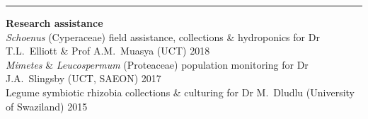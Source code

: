 \documentclass[10pt]{article}
\begin{document}
\vskip1pt



\vskip10pt

\hrule

\vskip5pt

\textbf{Research assistance} \\ %
\textit{Schoenus} (Cyperaceae)
  field assistance, collections \& hydroponics
  for Dr T.L.~Elliott \& Prof A.M.~Muasya
  {\small (UCT)}                                         \hfill {\small 2018} \\
\textit{Mimetes} \& \textit{Leucospermum} (Proteaceae)
  population monitoring
  for Dr J.A.~Slingsby
  {\small (UCT, SAEON)}                                  \hfill {\small 2017} \\
Legume symbiotic rhizobia
  collections \& culturing
  for Dr M.~Dludlu
  {\small (University of Swaziland)}                     \hfill {\small 2015} \\
\end{document}
